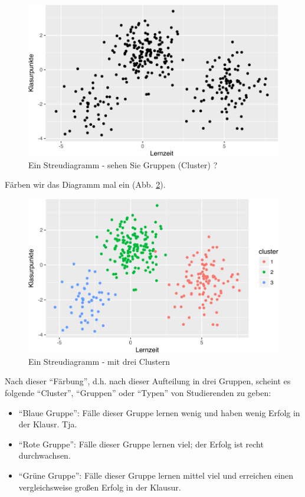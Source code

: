 \documentclass[12pt,ngerman,]{book}
\begin{document}
\begin{figure}

{\centering \includegraphics[width=0.7\linewidth]{082_Clusteranalyse_files/figure-latex/cluster1-1} 

}

\caption{Ein Streudiagramm - sehen Sie Gruppen (Cluster) ?}\label{fig:cluster1}
\end{figure}

Färben wir das Diagramm mal ein (Abb. \ref{fig:cluster2}).

\begin{figure}

{\centering \includegraphics[width=0.7\linewidth]{082_Clusteranalyse_files/figure-latex/cluster2-1} 

}

\caption{Ein Streudiagramm - mit drei Clustern}\label{fig:cluster2}
\end{figure}

Nach dieser ``Färbung'', d.h. nach dieser Aufteilung in drei Gruppen,
scheint es folgende ``Cluster'', ``Gruppen'' oder ``Typen'' von
Studierenden zu geben:

\begin{itemize}
\item
  ``Blaue Gruppe'': Fälle dieser Gruppe lernen wenig und haben wenig
  Erfolg in der Klausr. Tja.
\item
  ``Rote Gruppe'': Fälle dieser Gruppe lernen viel; der Erfolg ist recht
  durchwachsen.
\item
  ``Grüne Gruppe'': Fälle dieser Gruppe lernen mittel viel und erreichen
  einen vergleichsweise großen Erfolg in der Klausur.
\end{itemize}
\end{document}
